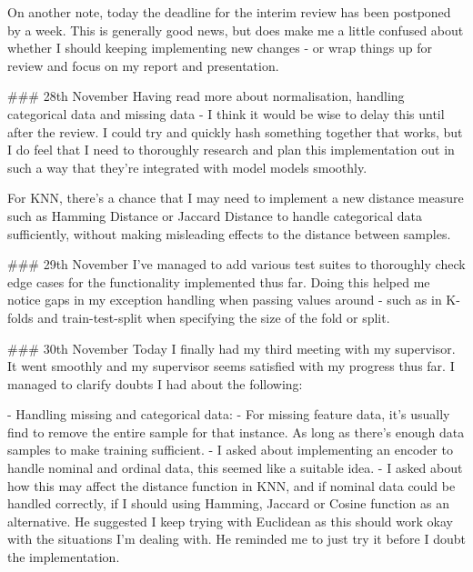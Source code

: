 \documentclass[letterpaper,10pt]{article}
\begin{document}
\begin{markdown}
On another note, today the deadline for the interim review has been postponed by a week. This is generally good news, but does make me a little confused about whether I should keeping implementing new changes - or wrap things up for review and focus on my report and presentation.

### 28th November
Having read more about normalisation, handling categorical data and missing data - I think it would be wise to delay this until after the review. I could try and quickly hash something together that works, but I do feel that I need to thoroughly research and plan this implementation out in such a way that they're integrated with model models smoothly.  
  
For KNN, there's a chance that I may need to implement a new distance measure such as Hamming Distance or Jaccard Distance to handle categorical data sufficiently, without making misleading effects to the distance between samples. 

### 29th November
I've managed to add various test suites to thoroughly check edge cases for the functionality implemented thus far. Doing this helped me notice gaps in my exception handling when passing values around - such as in K-folds and train-test-split when specifying the size of the fold or split. 

### 30th November
Today I finally had my third meeting with my supervisor. It went smoothly and my supervisor seems satisfied with my progress thus far. I managed to clarify doubts I had about the following:  
  
- Handling missing and categorical data:
  - For missing feature data, it's usually find to remove the entire sample for that instance. As long as there's enough data samples to make training sufficient.  
  - I asked about implementing an encoder to handle nominal and ordinal data, this seemed like a suitable idea.  
  - I asked about how this may affect the distance function in KNN, and if nominal data could be handled correctly, if I should using Hamming, Jaccard or Cosine function as an alternative. He suggested I keep trying with Euclidean as this should work okay with the situations I'm dealing with. He reminded me to just try it before I doubt the implementation.


\end{markdown}
\end{document}
